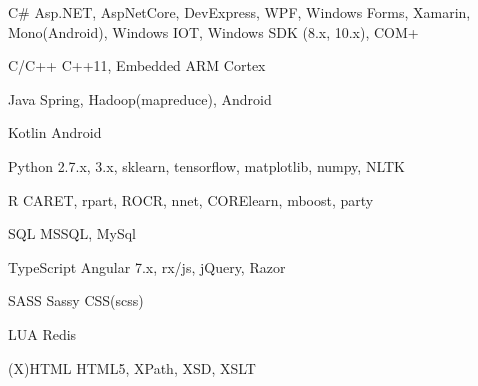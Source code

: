 

\begin{cvskills}


  \cvskill
    {C\#} %
    {Asp.NET, AspNetCore, DevExpress, WPF, Windows Forms, Xamarin, \newline Mono(Android), Windows IOT, Windows SDK (8.x, 10.x), COM+} %

\cvskill
{C/C++} %
{C++11, Embedded ARM Cortex} %

\cvskill
{Java} %
{Spring, Hadoop(mapreduce), Android} %

\cvskill
{Kotlin} %
{Android} %

\cvskill
{Python} %
{2.7.x, 3.x, sklearn, tensorflow, matplotlib, numpy, NLTK} %

\cvskill
{R} %
{CARET, rpart, ROCR, nnet, CORElearn, mboost, party} %

\cvskill
{SQL} %
{MSSQL, MySql} %

\cvskill
{TypeScript} %
{Angular 7.x, rx/js, jQuery, Razor} %

\cvskill
{SASS} %
{Sassy CSS(scss)} %

\cvskill
{LUA} %
{Redis} %

\cvskill
{(X)HTML} %
{HTML5, XPath, XSD, XSLT} %
\end{cvskills}


